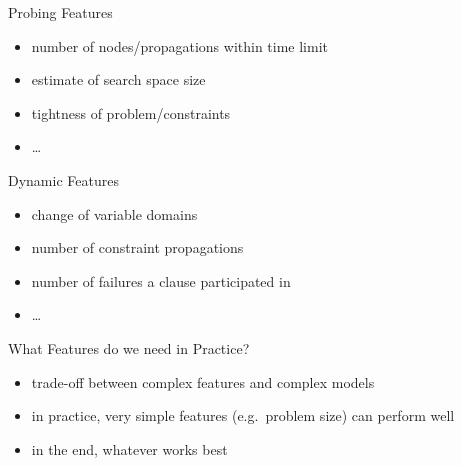 \begin{frame}{Probing Features}
\begin{itemize}
\item number of nodes/propagations within time limit
\item estimate of search space size
\item tightness of problem/constraints
\item \ldots
\end{itemize}
\end{frame}

\begin{frame}{Dynamic Features}
\begin{itemize}
\item change of variable domains
\item number of constraint propagations
\item number of failures a clause participated in
\item \ldots
\end{itemize}
\end{frame}

\begin{frame}{What Features do we need in Practice?}
\begin{itemize}
\item trade-off between complex features and complex models
\item in practice, very simple features (e.g.\ problem size) can perform well
\item in the end, whatever works best
\end{itemize}
\end{frame}


